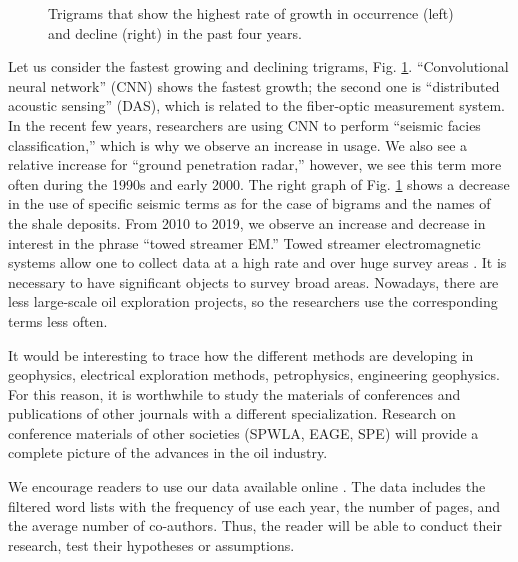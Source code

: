 \documentclass[geosciences,article,submit,moreauthors,pdftex]{Definitions/mdpi}
\begin{document}
\begin{figure}[ht!]


\caption{Trigrams that show the highest rate of growth in occurrence (left) and decline (right) in the past four years.}
\label{trigrams}
\end{figure}

Let us consider the fastest growing and declining trigrams, Fig. \ref{trigrams}. ``Convolutional neural network'' (CNN) shows the fastest growth; the second one is ``distributed acoustic sensing'' (DAS), which is related to the fiber-optic measurement system. In the recent few years, researchers are using CNN to perform ``seismic facies classification,'' which is why we observe an increase in usage. We also see a relative increase for ``ground penetration radar,'' however, we see this term more often during the 1990s and early 2000. The right graph of Fig. \ref{trigrams} shows a decrease in the use of specific seismic terms as for the case of bigrams and the names of the shale deposits. From 2010 to 2019, we observe an increase and decrease in interest in the phrase ``towed streamer EM.'' Towed streamer electromagnetic systems allow one to collect data at a high rate and over huge survey areas \citep{Zhdanov2015}. It is necessary to have significant objects to survey broad areas. Nowadays, there are less large-scale oil exploration projects, so the researchers use the corresponding terms less often.

It would be interesting to trace how the different methods are developing in geophysics, electrical exploration methods, petrophysics, engineering geophysics. For this reason, it is worthwhile to study the materials of conferences and publications of other journals with a different specialization. Research on conference materials of other societies (SPWLA, EAGE, SPE) will provide a complete picture of the advances in the oil industry.

We encourage readers to use our data available online \citep{Eltsov2020}. The data includes the filtered word lists with the frequency of use each year, the number of pages, and the average number of co-authors. Thus, the reader will be able to conduct their research, test their hypotheses or assumptions.
\end{document}
